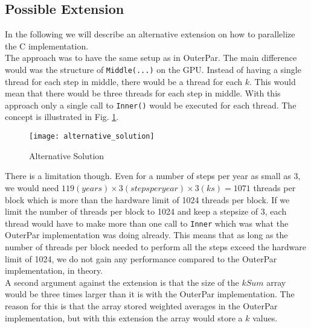 \subsection{Possible Extension}
In the following we will describe an alternative extension on how to parallelize the C implementation. \\

The approach was to have the same setup as in OuterPar. The main difference would was the structure of \texttt{Middle(...)} on the GPU. Instead of having a single thread for each step in middle, there would be a thread for each $k$. This would mean that there would be three threads for each step in middle. With this approach only a single call to \texttt{Inner()} would be executed for each thread. The concept is illustrated in Fig. \ref{fig:alternative}. \\

\begin{figure}[ht!]
  \centering
    \texttt{[image: alternative\_solution]}
  \caption{Alternative Solution}
  \label{fig:alternative}
\end{figure}

There is a limitation though. Even for a number of steps per year as small as 3, we would need $119(years) \times 3(steps per year) \times 3(ks) = 1071$ threads per block which is more than the hardware limit of 1024 threads per block. If we limit the number of threads per block to 1024 and keep a stepsize of 3, each thread would have to make more than one call to \texttt{Inner} which was what the OuterPar implementation was doing already. This means that as long as the number of threads per block needed to perform all the steps exceed the hardware limit of 1024, we do not gain any performance compared to the OuterPar implementation, in theory. \\

A second argument against the extension is that the size of the $kSum$ array would be three times larger than it is with the OuterPar implementation. The reason for this is that the array stored weighted averages in the OuterPar implementation, but with this extension the array would store a $k$ values. \\


